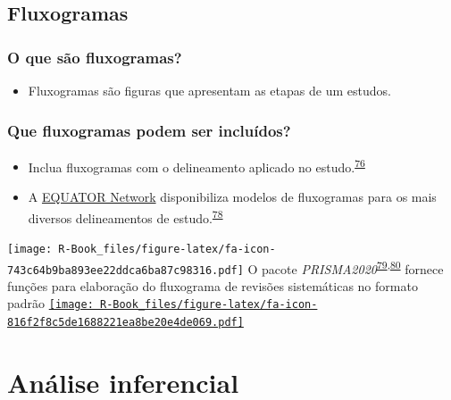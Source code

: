 \documentclass[
]{book}
\providecommand{\tightlist}{%
  \setlength{\itemsep}{0pt}\setlength{\parskip}{0pt}}
\begin{document}
\hypertarget{fluxogramas}{%
\section{Fluxogramas}\label{fluxogramas}}

\hypertarget{o-que-suxe3o-fluxogramas}{%
\subsection{O que são fluxogramas?}\label{o-que-suxe3o-fluxogramas}}

\begin{itemize}
\tightlist
\item
  Fluxogramas são figuras que apresentam as etapas de um estudos.
\end{itemize}

\hypertarget{que-fluxogramas-podem-ser-incluuxeddos}{%
\subsection{Que fluxogramas podem ser incluídos?}\label{que-fluxogramas-podem-ser-incluuxeddos}}

\begin{itemize}
\item
  Inclua fluxogramas com o delineamento aplicado no estudo.\textsuperscript{\protect\hyperlink{ref-Weissgerber2019}{76}}
\item
  A \href{https://www.equator-network.org}{EQUATOR Network} disponibiliza modelos de fluxogramas para os mais diversos delineamentos de estudo.\textsuperscript{\protect\hyperlink{ref-Altman2008}{78}}
\end{itemize}

\texttt{[image: R-Book\_files/figure-latex/fa-icon-743c64b9ba893ee22ddca6ba87c98316.pdf]} O pacote \emph{PRISMA2020}\textsuperscript{\protect\hyperlink{ref-PRISMA2020-2}{79},\protect\hyperlink{ref-PRISMA2020}{80}} fornece funções para elaboração do fluxograma de revisões sistemáticas no formato padrão \href{https://cran.r-project.org/web/packages/PRISMA2020/index.html}{\texttt{[image: R-Book\_files/figure-latex/fa-icon-816f2f8c5de1688221ea8be20e4de069.pdf]}}

\hypertarget{analise-inferencial}{%
\chapter{\texorpdfstring{\textbf{Análise inferencial}}{Análise inferencial}}\label{analise-inferencial}}
\end{document}
